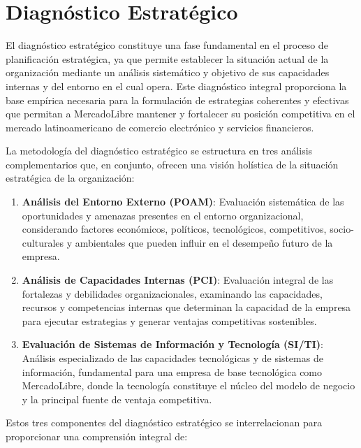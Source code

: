 \section{Diagnóstico Estratégico}
\label{sec:diagnostico_estrategico}

El diagnóstico estratégico constituye una fase fundamental en el proceso de planificación estratégica, ya que permite establecer la situación actual de la organización mediante un análisis sistemático y objetivo de sus capacidades internas y del entorno en el cual opera. Este diagnóstico integral proporciona la base empírica necesaria para la formulación de estrategias coherentes y efectivas que permitan a MercadoLibre mantener y fortalecer su posición competitiva en el mercado latinoamericano de comercio electrónico y servicios financieros.

La metodología del diagnóstico estratégico se estructura en tres análisis complementarios que, en conjunto, ofrecen una visión holística de la situación estratégica de la organización:

\begin{enumerate}
\item \textbf{Análisis del Entorno Externo (POAM)}: Evaluación sistemática de las oportunidades y amenazas presentes en el entorno organizacional, considerando factores económicos, políticos, tecnológicos, competitivos, socio-culturales y ambientales que pueden influir en el desempeño futuro de la empresa.

\item \textbf{Análisis de Capacidades Internas (PCI)}: Evaluación integral de las fortalezas y debilidades organizacionales, examinando las capacidades, recursos y competencias internas que determinan la capacidad de la empresa para ejecutar estrategias y generar ventajas competitivas sostenibles.

\item \textbf{Evaluación de Sistemas de Información y Tecnología (SI/TI)}: Análisis especializado de las capacidades tecnológicas y de sistemas de información, fundamental para una empresa de base tecnológica como MercadoLibre, donde la tecnología constituye el núcleo del modelo de negocio y la principal fuente de ventaja competitiva.
\end{enumerate}

Estos tres componentes del diagnóstico estratégico se interrelacionan para proporcionar una comprensión integral de:


